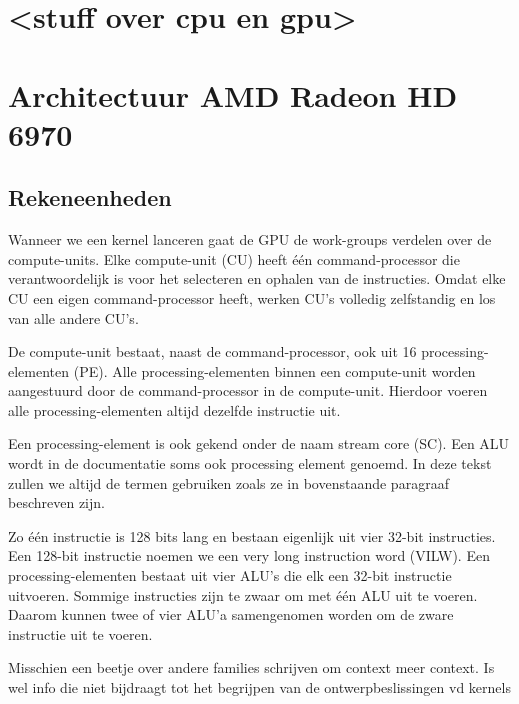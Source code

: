 \section{<stuff over cpu en gpu>}

\section{Architectuur AMD Radeon HD 6970}
\subsection{Rekeneenheden}

Wanneer we een kernel lanceren gaat de GPU de work-groups verdelen over de compute-units. Elke compute-unit (CU) heeft \'e\'en command-processor die verantwoordelijk is voor het selecteren en ophalen van de instructies. Omdat elke CU een eigen command-processor heeft, werken CU's volledig zelfstandig en los van alle andere CU's. 

De compute-unit bestaat, naast de command-processor, ook uit 16 processing-elementen (PE). Alle processing-elementen binnen een compute-unit worden aangestuurd door de command-processor in de compute-unit. Hierdoor voeren alle processing-elementen altijd dezelfde instructie uit.

Een processing-element is ook gekend onder de naam stream core (SC). Een ALU wordt in de documentatie soms ook processing element genoemd. In deze tekst zullen we altijd de termen gebruiken zoals ze in bovenstaande paragraaf beschreven zijn.

Zo \'e\'en instructie is 128 bits lang en bestaan eigenlijk uit vier 32-bit instructies. Een 128-bit instructie noemen we een very long instruction word (VILW). Een processing-elementen bestaat uit vier ALU's die elk een 32-bit instructie uitvoeren. Sommige instructies zijn te zwaar om met \'e\'en ALU uit te voeren. Daarom kunnen twee of vier ALU'a samengenomen worden om de zware instructie uit te voeren.

Misschien een beetje over andere families schrijven om context meer context. Is wel info die niet bijdraagt tot het begrijpen van de ontwerpbeslissingen vd kernels



